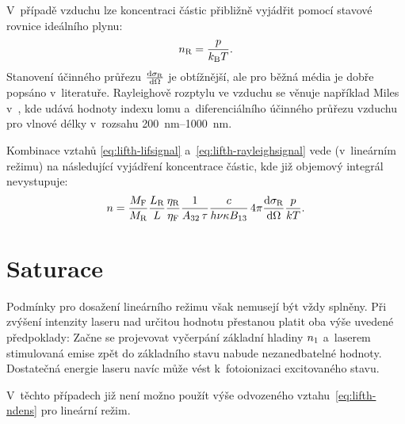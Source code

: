 V~případě vzduchu lze koncentraci částic přibližně vyjádřit pomocí
stavové rovnice ideálního plynu:
\begin{equation}
	n_\text{R} = \frac{p}{k_\text{B}T}.
\end{equation}
Stanovení účinného průřezu $\dv{\sigma_\text{R}}{\Omega}$ je obtížnější,
ale pro běžná média je dobře popsáno v~literatuře.
Rayleighově rozptylu ve vzduchu se věnuje například Miles v~\cite{rayleigh},
kde udává hodnoty indexu lomu a~diferenciálního účinného průřezu vzduchu
pro vlnové délky v~rozsahu \SIrange{200}{1000}{\nano\metre}.

Kombinace vztahů \eqref{eq:lifth-lifsignal} a~\eqref{eq:lifth-rayleighsignal}
vede (v~lineárním režimu) na následující vyjádření koncentrace částic,
kde již objemový integrál nevystupuje:
\begin{equation}
	\label{eq:lifth-ndens}
	n = \frac{M_\text{F}}{M_\text{R}}
	\frac{L_\text{R}}{L}\frac{\eta_\text{R}}{\eta_\text{F}}
	\frac{1}{A_{32}\,\tau}
	\frac{c}{h\nu\kappa B_{13}}
	\, 4\pi \dv{\sigma_\text{R}}{\Omega} \frac{p}{kT}.
\end{equation}

\section{Saturace}
\label{sec:lifth-saturation}
Podmínky pro dosažení lineárního režimu však nemusejí být vždy splněny.
Při zvýšení intenzity laseru nad určitou hodnotu přestanou platit oba
výše uvedené předpoklady:
Začne se projevovat vyčerpání základní hladiny $n_1$
a~laserem stimulovaná emise zpět do základního stavu nabude nezanedbatelné
hodnoty.
Dostatečná energie laseru navíc může vést k~fotoionizaci excitovaného stavu.

V~těchto případech již není možno použít výše odvozeného
vztahu~\eqref{eq:lifth-ndens} pro lineární režim.
